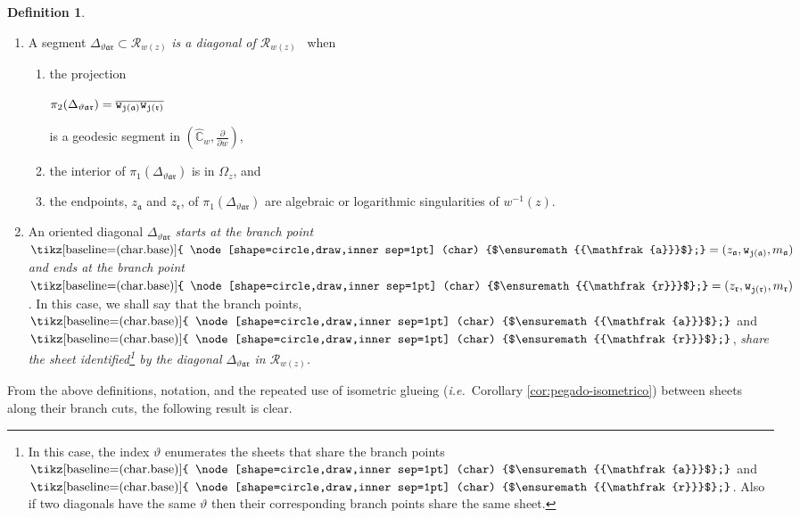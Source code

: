 \documentclass[final,3p,times]{elsarticle}
\newcommand{\CW}{\ensuremath{{\widehat{\mathbb C}}}}
\newcommand{\R}{\ensuremath{{\mathcal R}}}
\newcommand{\del}[2]{\frac{\partial #1}{\partial #2}}
\newcommand{\circled}[1]{ \text{\tikz[baseline=(char.base)]{
    \node[shape=circle,draw,inner sep=1pt] (char) {$#1$};}} }
\newcommand{\msigma}{\ensuremath{{\mathfrak{a}}}}
\newcommand{\mrho}{\ensuremath{{\mathfrak{r}}}}
\theoremstyle{definition}
\newtheorem{definition}[theorem]{Definition}
\begin{document}
\begin{definition}
\label{def:diagonal}
\
\begin{enumerate}[label=\arabic*),leftmargin=*] 
\item
A segment $\Delta_{\vartheta \msigma \mrho}\subset\R_{w(z)}$ 
\emph{is a diagonal of $\R_{w(z)}$} \,
when 

\begin{enumerate}[label=\roman*),leftmargin=*] 
\item 
the projection 

\centerline{
$\pi_2(\Delta_{\vartheta \msigma \mrho}) = 
\overline{{\tt w}_{{\tt j}(\msigma)} {\tt w}_{{\tt j}(\mrho)}}$
}

\noindent 
is a geodesic segment in $(\CW_w, \del{}{w})$,

\item
the interior 
of $\pi_{1}(\Delta_{\vartheta \msigma \mrho})$ is in 
$\Omega_{z}$, and 

\item
the endpoints, $z_{\msigma}$ and $z_{\mrho}$, of
$\pi_{1}(\Delta_{\vartheta \msigma \mrho})$
are algebraic or logarithmic singularities of $w^{-1}(z)$.
\end{enumerate} 

\item
An oriented diagonal $\Delta_{\vartheta \msigma \mrho}$
\emph{starts at the branch point
$\circled{\msigma}=(z_{\msigma}, {\tt w}_{{\tt j}(\msigma)}, m_{\msigma})$ 
and ends at the branch point
$\circled{\mrho}=(z_{\mrho}, {\tt w}_{{\tt j}(\mrho)}, m_{\mrho})$}.
In this case, we shall say that the branch points,
$\circled{\msigma}$ and 
$\circled{\mrho}$,
\emph{share the sheet identified\footnote{
In this case, the index $\vartheta$ enumerates the 
sheets that share the branch points $\circled{\msigma}$ and 
$\circled{\mrho}$. 
Also if two diagonals have the same $\vartheta$ then their 
corresponding branch points share the same sheet.
} 
by the diagonal $\Delta_{\vartheta \msigma \mrho}$ in $\R_{w(z)}$.}
\end{enumerate}
\end{definition}

From the above definitions, notation, 
and the repeated use of isometric glueing
(\emph{i.e.}\ Corollary \ref{cor:pegado-isometrico}) between sheets along their branch cuts,
the following result is clear.
\end{document}
